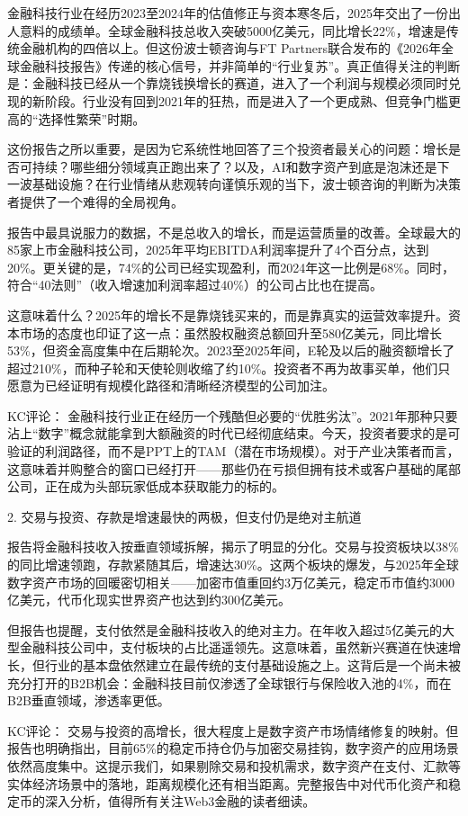 \documentclass[11pt]{ctexart}
\begin{document}
金融科技行业在经历2023至2024年的估值修正与资本寒冬后，2025年交出了一份出人意料的成绩单。全球金融科技总收入突破5000亿美元，同比增长22\%，增速是传统金融机构的四倍以上。但这份波士顿咨询与FT Partners联合发布的《2026年全球金融科技报告》传递的核心信号，并非简单的“行业复苏”。真正值得关注的判断是：金融科技已经从一个靠烧钱换增长的赛道，进入了一个利润与规模必须同时兑现的新阶段。行业没有回到2021年的狂热，而是进入了一个更成熟、但竞争门槛更高的“选择性繁荣”时期。

这份报告之所以重要，是因为它系统性地回答了三个投资者最关心的问题：增长是否可持续？哪些细分领域真正跑出来了？以及，AI和数字资产到底是泡沫还是下一波基础设施？在行业情绪从悲观转向谨慎乐观的当下，波士顿咨询的判断为决策者提供了一个难得的全局视角。

报告中最具说服力的数据，不是总收入的增长，而是运营质量的改善。全球最大的85家上市金融科技公司，2025年平均EBITDA利润率提升了4个百分点，达到20\%。更关键的是，74\%的公司已经实现盈利，而2024年这一比例是68\%。同时，符合“40法则”（收入增速加利润率超过40\%）的公司占比也在提高。

这意味着什么？2025年的增长不是靠烧钱买来的，而是靠真实的运营效率提升。资本市场的态度也印证了这一点：虽然股权融资总额回升至580亿美元，同比增长53\%，但资金高度集中在后期轮次。2023至2025年间，E轮及以后的融资额增长了超过210\%，而种子轮和天使轮则收缩了约10\%。投资者不再为故事买单，他们只愿意为已经证明有规模化路径和清晰经济模型的公司加注。

KC评论： 金融科技行业正在经历一个残酷但必要的“优胜劣汰”。2021年那种只要沾上“数字”概念就能拿到大额融资的时代已经彻底结束。今天，投资者要求的是可验证的利润路径，而不是PPT上的TAM（潜在市场规模）。对于产业决策者而言，这意味着并购整合的窗口已经打开——那些仍在亏损但拥有技术或客户基础的尾部公司，正在成为头部玩家低成本获取能力的标的。

2. 交易与投资、存款是增速最快的两极，但支付仍是绝对主航道

报告将金融科技收入按垂直领域拆解，揭示了明显的分化。交易与投资板块以38\%的同比增速领跑，存款紧随其后，增速达30\%。这两个板块的爆发，与2025年全球数字资产市场的回暖密切相关——加密市值重回约3万亿美元，稳定币市值约3000亿美元，代币化现实世界资产也达到约300亿美元。

但报告也提醒，支付依然是金融科技收入的绝对主力。在年收入超过5亿美元的大型金融科技公司中，支付板块的占比遥遥领先。这意味着，虽然新兴赛道在快速增长，但行业的基本盘依然建立在最传统的支付基础设施之上。这背后是一个尚未被充分打开的B2B机会：金融科技目前仅渗透了全球银行与保险收入池的4\%，而在B2B垂直领域，渗透率更低。

KC评论： 交易与投资的高增长，很大程度上是数字资产市场情绪修复的映射。但报告也明确指出，目前65\%的稳定币持仓仍与加密交易挂钩，数字资产的应用场景依然高度集中。这提示我们，如果剔除交易和投机需求，数字资产在支付、汇款等实体经济场景中的落地，距离规模化还有相当距离。完整报告中对代币化资产和稳定币的深入分析，值得所有关注Web3金融的读者细读。
\end{document}
